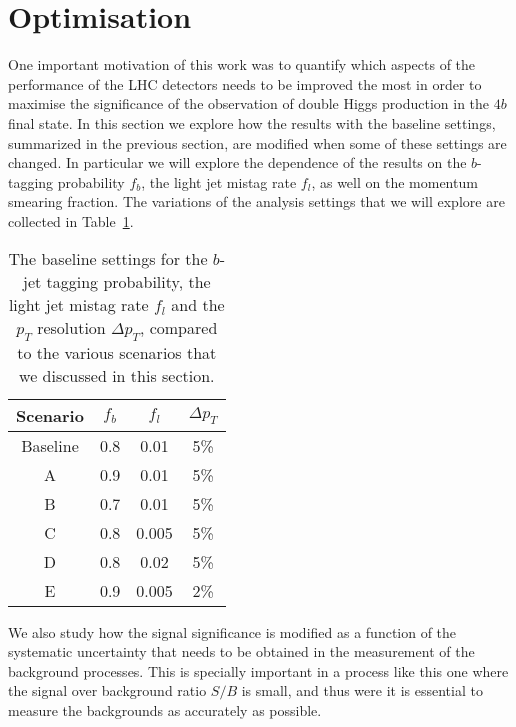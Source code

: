 
\section{Optimisation}
\label{sec:optimisation}

One important motivation of this work was to quantify which aspects
of the performance of the LHC detectors needs to be improved
the most in order to maximise the significance of the observation
of double Higgs production in the $4b$ final state.
%
In this section we explore how the results with the baseline settings,
summarized in the previous section, are modified when some of
these settings are changed.
%
In particular we will explore the dependence of the results on
the $b$-tagging probability $f_b$, the light jet mistag rate
$f_l$, as well on the momentum smearing fraction.
%
The variations of the analysis
settings that we will explore are collected in
Table~\ref{sec:variations}.

\begin{table}[h]
  \centering
  \begin{tabular}{|c|c|c|c|}
\hline
    Scenario  &  $f_b$  &  $f_l$  &  $\Delta p_T$ \\
    \hline
    \hline
    Baseline  &  0.8   &   0.01  &  5\% \\
    \hline
    A        &  0.9   &   0.01  &  5\% \\
    B        &  0.7   &   0.01  &  5\% \\
    C        &  0.8   &   0.005  &  5\% \\
    D        &  0.8   &   0.02  &  5\% \\
    E        &  0.9   &   0.005  &  2\% \\   
    \hline
  \end{tabular}
  \caption{\small The baseline settings for the $b$-jet
    tagging probability, the light jet mistag rate $f_l$
    and the $p_T$ resolution $\Delta p_T$, compared
    to the various scenarios that we discussed in this section.
\label{sec:variations}
  }
  \end{table}

We also study how the signal significance is modified as a function
of the systematic uncertainty that needs to be obtained
in the measurement of the background processes.
%
This is specially important in a process like this one where
the signal over background ratio $S/B$ is small, and thus were
it is essential to measure the backgrounds as accurately
as possible.
